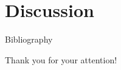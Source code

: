 \documentclass{beamer}
\begin{document}
\section{Discussion}


\begin{frame}{Bibliography}
	\nocite{*}
	
	
\end{frame}


\begin{frame}
\Huge{\centerline{Thank you for your attention!}}
\end{frame}

\end{document}
